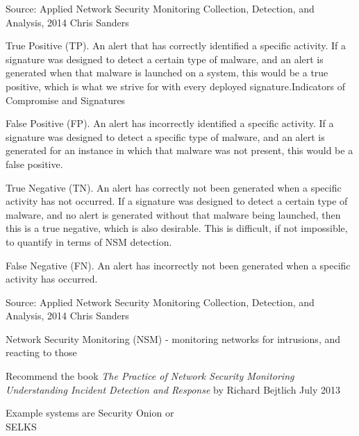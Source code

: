 \documentclass[Screen16to9,17pt]{foils}
\begin{document}
Source: Applied Network Security Monitoring Collection, Detection, and Analysis, 2014 Chris Sanders


\small
\begin{list2}
\item True Positive (TP). An alert that has correctly identified a specific activity. If a signature was designed to detect a certain type of malware, and an alert is generated when that malware is launched on a system, this would be a true positive, which is what we strive for with every deployed signature.Indicators of Compromise and Signatures
\item False Positive (FP). An alert has incorrectly identified a specific activity. If a signature was designed to detect a specific type of malware, and an alert is generated for an instance in which that malware was not present, this would be a false positive.
\item True Negative (TN). An alert has correctly not been generated when a specific activity has not occurred. If a signature was designed to detect a certain type of malware, and no alert is generated without that malware being launched, then this is a true negative, which is also desirable. This is difficult, if not impossible, to quantify in terms of NSM detection.
\item False Negative (FN). An alert has incorrectly not been generated when a specific activity has occurred.
\end{list2}

Source: Applied Network Security Monitoring Collection, Detection, and Analysis, 2014 Chris Sanders



\begin{list1}
\item Network Security Monitoring (NSM) - monitoring networks for intrusions, and reacting to those
\item Recommend the book \emph{The Practice of Network Security Monitoring
Understanding Incident Detection and Response}
by Richard Bejtlich
July 2013
\item Example systems are Security Onion  or\\ SELKS 
\end{list1}
\end{document}
